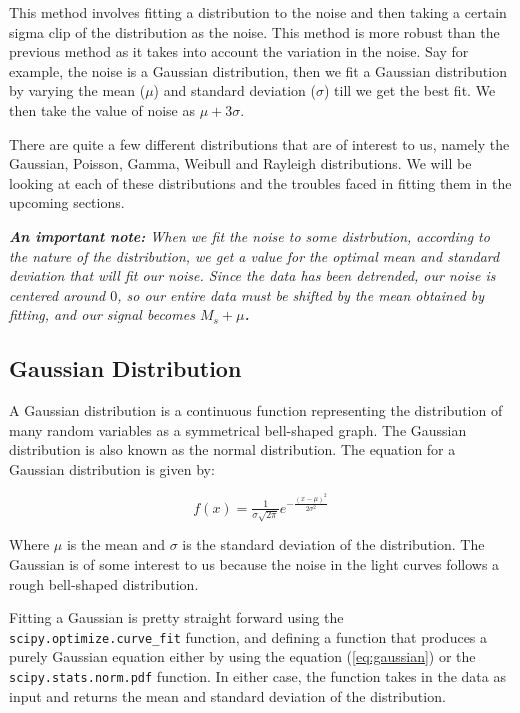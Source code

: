 \documentclass[11pt]{book} %
\begin{document}
This method involves fitting a distribution to the noise and then taking a certain sigma clip of the distribution as the noise. This method is more robust than the previous method as it takes into account the variation in the noise. Say for example, the noise is a Gaussian distribution, then we fit a Gaussian distribution by varying the mean ($\mu$) and standard deviation ($\sigma$) till we get the best fit. We then take the value of noise as $\mu+3\sigma$. 

There are quite a few different distributions that are of interest to us, namely the Gaussian, Poisson, Gamma, Weibull and Rayleigh distributions. We will be looking at each of these distributions and the troubles faced in fitting them in the upcoming sections.

\vspace{2cm}

\textit{\textbf{An important note:} When we fit the noise to some distrbution, according to the nature of the distribution, we get a value for the optimal mean and standard deviation that will fit our noise. Since the data has been detrended, our noise is centered around $0$, so our entire data must be shifted by the mean obtained by fitting, and our signal becomes \textbf{$M_s+\mu$.}}


\newpage

\subsection{Gaussian Distribution}

A Gaussian distribution is a continuous function representing the distribution of many random variables as a symmetrical bell-shaped graph. The Gaussian distribution is also known as the normal distribution. The equation for a Gaussian distribution is given by:

\begin{equation} \label{eq:gaussian}
    f(x) = \tfrac{1}{\sigma\sqrt{2\pi}}e^{-\tfrac{(x-\mu)^2}{2\sigma^2}}
\end{equation}

Where $\mu$ is the mean and $\sigma$ is the standard deviation of the distribution. The Gaussian is of some interest to us because the noise in the light curves follows a rough bell-shaped distribution. 

Fitting a Gaussian is pretty straight forward using the \lstinline[language=Python]{scipy.optimize.curve_fit} function, and defining a function that produces a purely Gaussian equation either by using the equation (\ref{eq:gaussian}) or the \lstinline[language=Python]{scipy.stats.norm.pdf} function. In either case, the function takes in the data as input and returns the mean and standard deviation of the distribution. 
\end{document}
